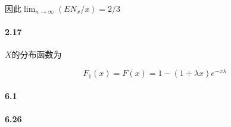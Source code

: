 \documentclass{../notes}
\begin{document}
    因此$\lim_{n\rightarrow\infty} (EN_x / x) = 2 / 3$

    \paragraph*{2.17} $X$的分布函数为

    \begin{equation}
        F_1(x) = F(x) = 1 - (1 + \lambda x)e^{-x\lambda}
    \end{equation}

    \paragraph*{6.1}

    \paragraph*{6.26}
\end{document}
